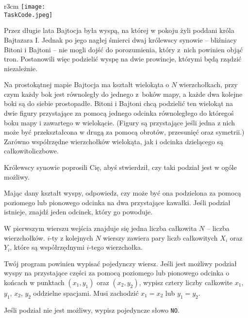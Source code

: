 \documentclass{boi2014-pl}
\renewcommand{\TaskCode}{demarcation}
\newcommand{\constant}[1]{{\tt #1}}
\begin{document}
    \begin{wrapfigure}{r}{3cm}
        \vspace{-24pt}
		\texttt{[image: \\TaskCode.jpeg]}
	\end{wrapfigure}

    Przez długie lata Bajtocja była wyspą, na której w pokoju żyli poddani króla Bajtazara I.
  Jednak po jego nagłej śmierci dwaj królewscy synowie -- bliźniacy Bitoni i Bajtoni -- nie
  mogli dojść do porozumienia, który z~nich powinien objąć tron. Postanowili więc podzielić
  wyspę na dwie prowincje, którymi będą rządzić niezależnie.

  Na prostokątnej mapie Bajtocja ma kształt wielokąta o $N$ wierzchołkach, przy czym każdy bok jest równoległy
  do jednego z~boków mapy, a każde dwa kolejne boki są do siebie prostopadłe.
  Bitoni i Bajtoni chcą podzielić ten wielokąt na dwie figury przystające za pomocą
  jednego odcinka równoległego do któregoś boku mapy i zawartego w wielokącie.
  (Figury są przystające jeśli jedna z nich może być przekształcona w drugą za pomocą obrotów, przesunięć oraz symetrii.)
  Zarówno współrzędne wierzchołków wielokąta, jak i odcinka dzielącego są całkowitoliczbowe.

  Królewscy synowie poprosili Cię, abyś stwierdził, czy taki podział jest
  w ogóle możliwy.

    \Task

    Mając dany kształt wyspy, odpowiedz, czy może być ona podzielona za pomocą poziomego lub pionowego
    odcinka na dwa przystające kawałki.
    Jeśli podział istnieje, znajdź jeden odcinek, który go powoduje.

    \Input
	W pierwszym wierszu wejścia znajduje się jedna liczba całkowita $N$ -- liczba wierzchołków.
        $i$-ty z kolejnych $N$ wierszy zawiera pary liczb całkowitych $X_i$ oraz $Y_i$, które są współrzędnymi $i$-tego wierzchołka.

	\Output
        Twój program powinien wypisać pojedynczy wiersz.
        Jeśli jest możliwy podział wyspy na przystające części za pomocą poziomego lub pionowego odcinka o
        końcach w punktach $(x_1,y_1)$ oraz $(x_2,y_2)$, wypisz cztery liczby całkowite $x_1$, $y_1$, $x_2$, $y_2$ oddzielne spacjami.
        Musi zachodzić $x_1 = x_2$ lub $y_1 = y_2$.
 
        Jeśli podział nie jest możliwy, wypisz pojedyncze słowo \constant{NO}.

    \clearpage
\end{document}
